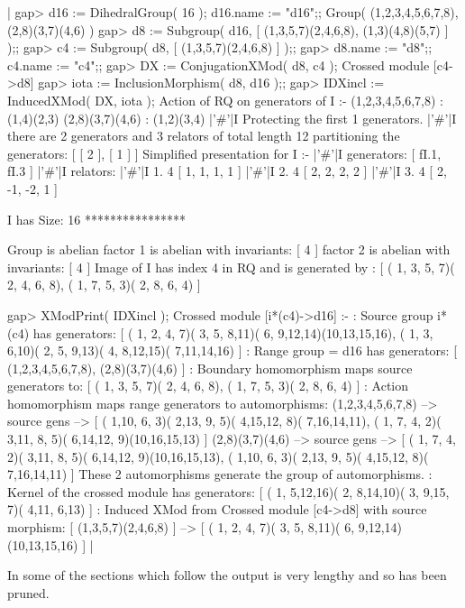 {|    gap> d16 := DihedralGroup( 16 );  d16.name := "d16";;
    Group( (1,2,3,4,5,6,7,8), (2,8)(3,7)(4,6) )
    gap> d8 := Subgroup( d16, [ (1,3,5,7)(2,4,6,8), (1,3)(4,8)(5,7) ] );;
    gap> c4 := Subgroup( d8, [ (1,3,5,7)(2,4,6,8) ] );;
    gap> d8.name :=  "d8";;  c4.name := "c4";;
    gap> DX := ConjugationXMod( d8, c4 );
    Crossed module [c4->d8]
    gap> iota := InclusionMorphism( d8, d16 );;
    gap> IDXincl := InducedXMod( DX, iota );
    Action of RQ on generators of I :- 
      (1,2,3,4,5,6,7,8) : (1,4)(2,3)
      (2,8)(3,7)(4,6) : (1,2)(3,4)
    |'\#'|I  Protecting the first 1 generators.
    |'\#'|I  there are 2 generators and 3 relators of total length 12
    partitioning the generators: [ [ 2 ], [ 1 ] ]
    Simplified presentation for I :- 
    |'\#'|I  generators: [ fI.1, fI.3 ]
    |'\#'|I  relators:
    |'\#'|I  1.  4  [ 1, 1, 1, 1 ]
    |'\#'|I  2.  4  [ 2, 2, 2, 2 ]
    |'\#'|I  3.  4  [ 2, -1, -2, 1 ]

     I has Size: 16
    **************** 

    Group is abelian 
    factor 1 is abelian with invariants: [ 4 ]
    factor 2 is abelian with invariants: [ 4 ]
    Image of I has index 4 in RQ and is generated by :   
    [ ( 1, 3, 5, 7)( 2, 4, 6, 8), ( 1, 7, 5, 3)( 2, 8, 6, 4) ]

    gap> XModPrint( IDXincl );
    Crossed module [i*(c4)->d16] :- 
    : Source group i*(c4) has generators:
      [ ( 1, 2, 4, 7)( 3, 5, 8,11)( 6, 9,12,14)(10,13,15,16), 
        ( 1, 3, 6,10)( 2, 5, 9,13)( 4, 8,12,15)( 7,11,14,16) ]
    : Range group = d16 has generators:
      [ (1,2,3,4,5,6,7,8), (2,8)(3,7)(4,6) ]
    : Boundary homomorphism maps source generators to:
      [ ( 1, 3, 5, 7)( 2, 4, 6, 8), ( 1, 7, 5, 3)( 2, 8, 6, 4) ]
    : Action homomorphism maps range generators to automorphisms:
      (1,2,3,4,5,6,7,8) --> { source gens --> 
    [ ( 1,10, 6, 3)( 2,13, 9, 5)( 4,15,12, 8)( 7,16,14,11), 
      ( 1, 7, 4, 2)( 3,11, 8, 5)( 6,14,12, 9)(10,16,15,13) ] }
      (2,8)(3,7)(4,6) --> { source gens --> 
    [ ( 1, 7, 4, 2)( 3,11, 8, 5)( 6,14,12, 9)(10,16,15,13), 
      ( 1,10, 6, 3)( 2,13, 9, 5)( 4,15,12, 8)( 7,16,14,11) ] }
      These 2 automorphisms generate the group of automorphisms.
    : Kernel of the crossed module has generators:
      [ ( 1, 5,12,16)( 2, 8,14,10)( 3, 9,15, 7)( 4,11, 6,13) ]
    : Induced XMod from Crossed module [c4->d8]  with source morphism:
      [ (1,3,5,7)(2,4,6,8) ]
       --> [ ( 1, 2, 4, 7)( 3, 5, 8,11)( 6, 9,12,14)(10,13,15,16) ]  |

In some of the sections which follow the output is very lengthy and so
has been pruned.
   
}
